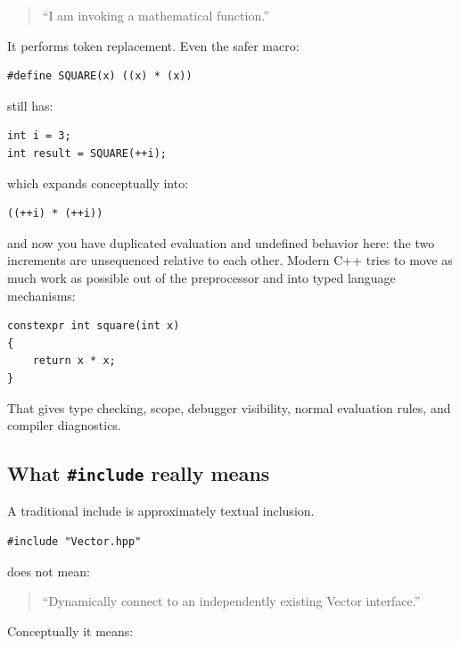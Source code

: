 \begin{quote}
``I am invoking a mathematical function.''
\end{quote}

It performs token replacement. Even the safer macro:

\begin{verbatim}
#define SQUARE(x) ((x) * (x))
\end{verbatim}

still has:

\begin{verbatim}
int i = 3;
int result = SQUARE(++i);
\end{verbatim}

which expands conceptually into:

\begin{verbatim}
((++i) * (++i))
\end{verbatim}

and now you have duplicated evaluation and undefined behavior here: the two increments are unsequenced relative to each other. Modern C++ tries to move as much work as possible out of the preprocessor and into typed language mechanisms:

\begin{verbatim}
constexpr int square(int x)
{
    return x * x;
}
\end{verbatim}

That gives type checking, scope, debugger visibility, normal evaluation rules, and compiler diagnostics.

\subsection{\texorpdfstring{What \texttt{\#include} really means}{What \#include really means}}\label{05-engine-i-ch002-what-include-really-means}

\hypertarget{05-engine-i-ch002-what-include-really-means}{}

A traditional include is approximately textual inclusion.

\begin{verbatim}
#include "Vector.hpp"
\end{verbatim}

does not mean:

\begin{quote}
``Dynamically connect to an independently existing Vector interface.''
\end{quote}

Conceptually it means:

